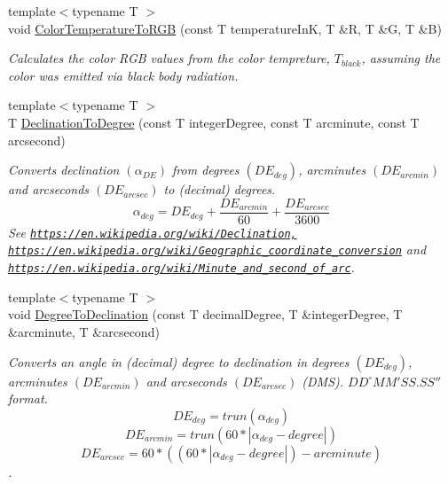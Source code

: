 \begin{DoxyCompactItemize}
{\footnotesize template$<$typename T $>$ }\\void \mbox{\hyperlink{group___e_g_x_phys-_astrophysics-_color_temperature_ga81db6b5b397c9f788001be73adae032d}{Color\+Temperature\+To\+R\+GB}} (const T temperature\+InK, T \&R, T \&G, T \&B)
\begin{DoxyCompactList}\small\item\em Calculates the color R\+GB values from the color tempreture, $T_{black}$, assuming the color was emitted via black body radiation. \end{DoxyCompactList}\item 
{\footnotesize template$<$typename T $>$ }\\T \mbox{\hyperlink{group___e_g_x_phys-_astrophysics-_declination_ga0c90ea1406801810378d9618553c9a9b}{Declination\+To\+Degree}} (const T integer\+Degree, const T arcminute, const T arcsecond)
\begin{DoxyCompactList}\small\item\em Converts declination $(\alpha_{DE})$ from degrees $(DE_{deg})$, arcminutes $(DE_{arcmin})$ and arcseconds $(DE_{arcsec})$ to (decimal) degrees. \[\alpha_{deg}=DE_{deg} + \frac{DE_{arcmin}}{60} + \frac{DE_{arcsec}}{3600} \] See \href{https://en.wikipedia.org/wiki/Declination,}{\tt https\+://en.\+wikipedia.\+org/wiki/\+Declination,} \href{https://en.wikipedia.org/wiki/Geographic_coordinate_conversion}{\tt https\+://en.\+wikipedia.\+org/wiki/\+Geographic\+\_\+coordinate\+\_\+conversion} and \href{https://en.wikipedia.org/wiki/Minute_and_second_of_arc}{\tt https\+://en.\+wikipedia.\+org/wiki/\+Minute\+\_\+and\+\_\+second\+\_\+of\+\_\+arc}. \end{DoxyCompactList}\item 
{\footnotesize template$<$typename T $>$ }\\void \mbox{\hyperlink{group___e_g_x_phys-_astrophysics-_declination_gaff645fbd9a1de42e9cdbfb37fdac78c9}{Degree\+To\+Declination}} (const T decimal\+Degree, T \&integer\+Degree, T \&arcminute, T \&arcsecond)
\begin{DoxyCompactList}\small\item\em Converts an angle in (decimal) degree to declination in degrees $(DE_{deg})$, arcminutes $(DE_{arcmin})$ and arcseconds $(DE_{arcsec})$ (D\+MS). ${DD}^{\circ}{MM}'{SS.SS}''$ format. \[DE_{deg}=trun(\alpha_{deg})\] \[DE_{arcmin}=trun(60 * |\alpha_{deg} - degree|)\] \[DE_{arcsec}=60 * ((60 * |\alpha_{deg} - degree|)-arcminute)\]. \end{DoxyCompactList}\item 

\end{DoxyCompactItemize}
